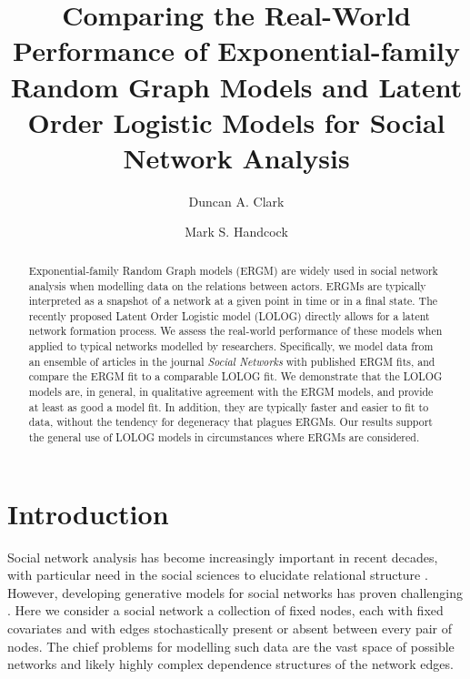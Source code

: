 \documentclass[
]{statsoc}
\title[ERGM and LOLOG Real-World Performance]{Comparing the Real-World Performance of Exponential-family Random Graph Models and Latent Order Logistic Models for Social Network Analysis}
\author[Duncan A. Clark]{Duncan A. Clark}
\author[Mark S. Handcock]{Mark S. Handcock}
\author{}
\date{\vspace{-2.5em}}
\begin{document}
\newcommand{\R}{\mathbb{R}}
\newcommand{\N}{\mathbb{N}}
\newcommand{\E}{\mathbb{E}}
\newcommand{\V}{\mathbb{V}}
\newcommand{\bfR}{\mathbf{R}}
\newcommand{\bfX}{\mathbf{X}}
\newcommand{\bfW}{\mathbf{W}}
\newcommand{\bfD}{\mathbf{D}}
\newcommand{\INT}{\int_{-\infty}^{+\infty}}
\newcommand{\p}{\partial}
\newcommand{\ra}{\Rightarrow}
\newcommand{\dH}{d\mathscr{H}}
\newcommand{\ch}{\text{cosh}}
\newcommand{\sh}{\text{sinh}}
\newcommand{\ex}{\mathbb{E}\left[X\right]}
\newcommand{\ey}{\mathbb{E}\left[Y\right]}
\newcommand{\logit}{{\rm logit}}
\newcommand{\MOM}{{\rm MOM}}

\setcounter{secnumdepth}{4}

\begin{abstract}
Exponential-family Random Graph models (ERGM) are widely used in social network analysis when modelling data on the relations between actors. ERGMs are typically interpreted as a snapshot of a network at a given point in time or in a final state. The recently proposed Latent Order Logistic model (LOLOG) directly allows for a latent network formation process. We assess the real-world performance of these models when applied to typical networks modelled by researchers. Specifically, 
we model data from an ensemble of articles in the journal \textit{Social Networks} with published ERGM fits, and compare the ERGM fit to a comparable LOLOG fit. We demonstrate that the LOLOG models are, in general, in qualitative agreement with the ERGM models, and provide at least as good a model fit. In addition, they are typically faster and easier to fit to data, without the tendency for degeneracy that plagues ERGMs.
Our results support the general use of LOLOG models in circumstances where ERGMs are considered.
\end{abstract}

\section{Introduction}

Social network analysis has become increasingly important in recent
decades, with particular need in the social sciences to elucidate
relational structure \citep{Goldenberg2010}. However, developing
generative models for social networks has proven challenging
\citep{chatterjee2013}. Here we consider a social network a collection
of fixed nodes, each with fixed covariates and with edges stochastically
present or absent between every pair of nodes. The chief problems for
modelling such data are the vast space of possible networks and likely
highly complex dependence structures of the network edges.
\end{document}
